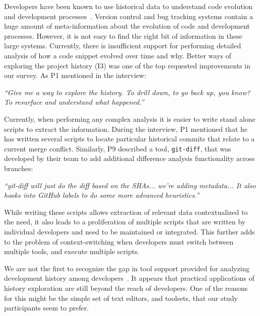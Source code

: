 
Developers have been known to use historical data to understand code evolution and development processes~\cite{Mihai_lenses}.
Version control and bug tracking systems contain a huge amount of meta-information about the evolution of code and development processes.
However, it is not easy to find the right bit of information in these large systems. 
Currently, there is insufficient support for performing detailed analysis of how a code snippet evolved over time and why. 
Better ways of exploring the project history (I3) was one of the top requested improvements in our survey. 
As P1 mentioned in the interview:
\begin{quoting}
\textit{``Give me a way to explore the history. To drill down, to go back up, you know? To resurface and understand what happened.''}
\end{quoting}


Currently, when performing any complex analysis it is easier to write stand alone scripts to extract the information. 
During the interview, P1 mentioned that he has written several scripts to locate particular historical commits that relate to a current merge conflict. 
Similarly, P9 described a tool, \texttt{git-diff}, that was developed by their team to add additional difference analysis functionality across branches:
\begin{quoting}
\textit{``git-diff will just do the diff based on the SHAs... we're adding metadata... It also hooks into GitHub labels to do some more advanced heuristics.''}
\end{quoting}

While writing these scripts allows extraction of relevant data contextualized to the need, it also leads to a proliferation of multiple scripts that are written by individual developers and need to be maintained or integrated.
This further adds to the problem of context-switching when developers must switch between multiple tools, and execute multiple scripts.

We are not the first to recognize the gap in tool support provided for analyzing development history among developers~\cite{Mihai_lenses, sun2015informationhistory, guo2016cold-start, yan2014miningcontracts}. 
It appears that practical applications of history exploration are still beyond the reach of developers. 
One of the reasons for this might be the simple set of text editors, and toolsets, that our study participants seem to prefer.

